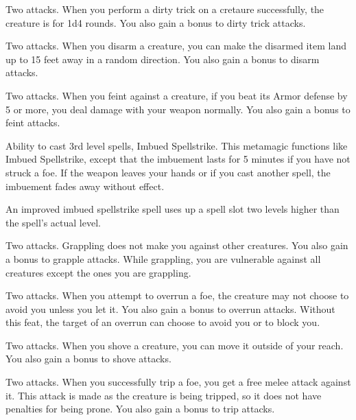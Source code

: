\featpre Two attacks.
\featben When you perform a dirty trick on a cretaure successfully, the creature is \vulnerable for 1d4 rounds.
You also gain a  bonus to dirty trick attacks.

\featpre Two attacks.
\featben When you disarm a creature, you can make the disarmed item land up to 15 feet away in a random direction.
You also gain a  bonus to disarm attacks.

\featpre Two attacks.
\featben When you feint against a creature, if you beat its Armor defense by 5 or more, you deal damage with your weapon normally.
You also gain a  bonus to feint attacks.

\featpres Ability to cast 3rd level spells, Imbued Spellstrike.
\featben This metamagic functions like Imbued Spellstrike, except that the imbuement lasts for 5 minutes if you have not struck a foe.
If the weapon leaves your hands or if you cast another spell, the imbuement fades away without effect.

An improved imbued spellstrike spell uses up a spell slot two levels higher than the spell's actual level.

\featpre Two attacks.
\featben Grappling does not make you \vulnerable against other creatures.
You also gain a  bonus to grapple attacks.
While grappling, you are vulnerable against all creatures except the ones you are grappling.

\featpre Two attacks.
\featben When you attempt to overrun a foe, the creature may not choose to avoid you unless you let it.
You also gain a  bonus to overrun attacks.
Without this feat, the target of an overrun can choose to avoid you or to block you.

\featpre Two attacks.
\featben When you shove a creature, you can move it outside of your reach.
You also gain a  bonus to shove attacks.

\featpre Two attacks.
\featben When you successfully trip a foe, you get a free melee attack against it.
This attack is made as the creature is being tripped, so it does not have penalties for being prone.
You also gain a  bonus to trip attacks.

